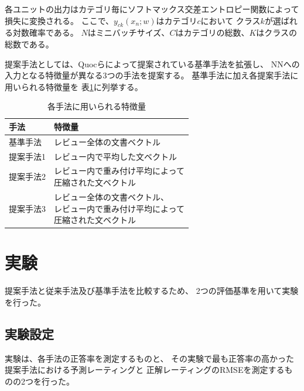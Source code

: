 \documentclass[twocolumn,a4paper]{ltjarticle}
\begin{document}
各ユニットの出力はカテゴリ毎にソフトマックス交差エントロピー関数によって
損失に変換される。
ここで、$y_{ck}(x_n; w)$はカテゴリ$c$において
クラス$k$が選ばれる対数確率である。
$N$はミニバッチサイズ、$C$はカテゴリの総数、$K$はクラスの総数である。

提案手法としては、Quocら\cite{quoc14}によって提案されている基準手法を拡張し、
NNへの入力となる特徴量が異なる3つの手法を提案する。
基準手法に加え各提案手法に用いられる特徴量を
表\ref{tab:MethodFeatures}に列挙する。

\begin{table}
  \caption{各手法に用いられる特徴量}
  \centering
  \begin{tabular}{l | l} \label{tab:MethodFeatures}
    手法 & 特徴量 \\
    \hline
    基準手法  & レビュー全体の文書ベクトル \\
    提案手法1 & レビュー内で平均した文ベクトル \\
    提案手法2 & \makecell[l]{レビュー内で重み付け平均によって \\
                             圧縮された文ベクトル} \\
    提案手法3 & \makecell[l]{レビュー全体の文書ベクトル、\\
                             レビュー内で重み付け平均によって \\
                             圧縮された文ベクトル} \\
  \end{tabular}
\end{table}



\section{実験}

提案手法と従来手法\cite{fujitani15}及び基準手法を比較するため、
2つの評価基準を用いて実験を行った。


\subsection{実験設定}

実験は、各手法の正答率を測定するものと、
その実験で最も正答率の高かった提案手法における予測レーティングと
正解レーティングのRMSEを測定するものの2つを行った。
\end{document}
